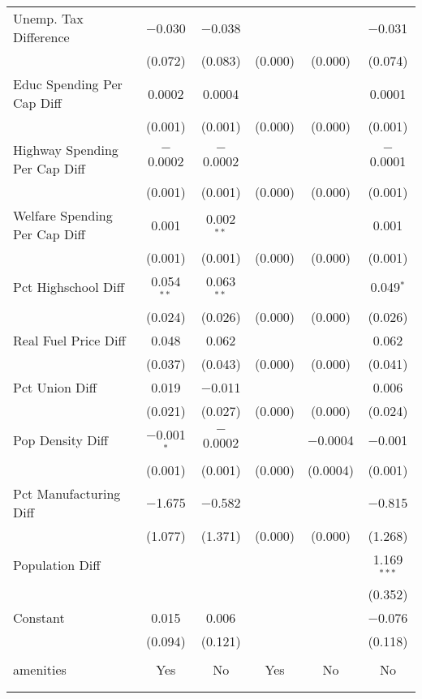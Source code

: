 \begin{table}[!htbp]
\begin{tabular}{@{\extracolsep{5pt}}lccccc}
  Unemp. Tax Difference & $-$0.030 & $-$0.038 &  &  & $-$0.031 \\ 
  & (0.072) & (0.083) & (0.000) & (0.000) & (0.074) \\ 
  Educ Spending Per Cap Diff & 0.0002 & 0.0004 &  &  & 0.0001 \\ 
  & (0.001) & (0.001) & (0.000) & (0.000) & (0.001) \\ 
  Highway Spending Per Cap Diff & $-$0.0002 & $-$0.0002 &  &  & $-$0.0001 \\ 
  & (0.001) & (0.001) & (0.000) & (0.000) & (0.001) \\ 
  Welfare Spending Per Cap Diff & 0.001 & 0.002$^{**}$ &  &  & 0.001 \\ 
  & (0.001) & (0.001) & (0.000) & (0.000) & (0.001) \\ 
  Pct Highschool Diff & 0.054$^{**}$ & 0.063$^{**}$ &  &  & 0.049$^{*}$ \\ 
  & (0.024) & (0.026) & (0.000) & (0.000) & (0.026) \\ 
  Real Fuel Price Diff & 0.048 & 0.062 &  &  & 0.062 \\ 
  & (0.037) & (0.043) & (0.000) & (0.000) & (0.041) \\ 
  Pct Union Diff & 0.019 & $-$0.011 &  &  & 0.006 \\ 
  & (0.021) & (0.027) & (0.000) & (0.000) & (0.024) \\ 
  Pop Density Diff & $-$0.001$^{*}$ & $-$0.0002 &  & $-$0.0004 & $-$0.001 \\ 
  & (0.001) & (0.001) & (0.000) & (0.0004) & (0.001) \\ 
  Pct Manufacturing Diff & $-$1.675 & $-$0.582 &  &  & $-$0.815 \\ 
  & (1.077) & (1.371) & (0.000) & (0.000) & (1.268) \\ 
  Population Diff &  &  &  &  & 1.169$^{***}$ \\ 
  &  &  &  &  & (0.352) \\ 
  Constant & 0.015 & 0.006 &  &  & $-$0.076 \\ 
  & (0.094) & (0.121) &  &  & (0.118) \\ 
 \hline \\[-1.8ex] 
amenities & Yes & No & Yes & No & No \\ 
\hline \\[-1.8ex] 
\hline 
\hline \\[-1.8ex] 
\end{tabular} 
\end{table} 

